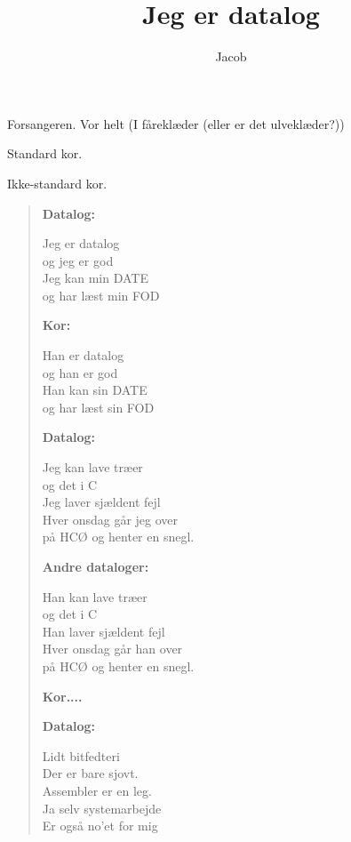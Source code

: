 \documentclass[a4paper,11pt]{article}
\title{Jeg er datalog}
\author{Jacob}
\begin{document}
\maketitle

\begin{roles}

 Forsangeren. Vor helt (I fåreklæder (eller er det
ulveklæder?)) 

 Standard kor.

 Ikke-standard kor.

\end{roles}

\begin{verse}

{\bf Datalog:}

Jeg er datalog \\
og jeg er god \\
Jeg kan min DATE \\
og har læst min FOD

\bigskip

{\bf Kor:}

Han er datalog \\
og han er god \\
Han kan sin DATE \\
og har læst sin FOD

\bigskip

{\bf Datalog:}

Jeg kan lave træer \\
og det i C \\
Jeg laver sjældent fejl \\
Hver onsdag går jeg over \\
på HCØ og henter en snegl. 

\bigskip

{\bf Andre dataloger:}

Han kan lave træer \\
og det i C \\
Han laver sjældent fejl \\
Hver onsdag går han over \\
på HCØ og henter en snegl. 

\bigskip

{\bf Kor....}

\bigskip

{\bf Datalog:}

Lidt bitfedteri \\
Der er bare sjovt. \\
Assembler er en leg. \\
Ja selv systemarbejde \\
Er også no'et for mig


\end{verse}
\end{document}
